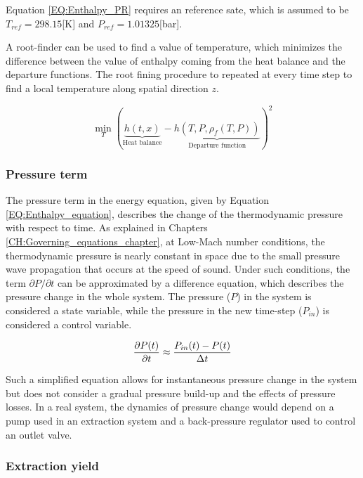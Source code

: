 \documentclass[../Article_Model_Parameters.tex]{subfiles}
\begin{document}
			Equation \ref{EQ:Enthalpy_PR} requires an reference sate, which is assumed to be $T_{ref}=298.15$[K] and $P_{ref}=1.01325$[bar].
			
			A root-finder can be used to find a value of temperature, which minimizes the difference between the value of enthalpy coming from the heat balance and the departure functions. The root fining procedure to repeated at every time step to find a local temperature along spatial direction $z$.
			
			{\footnotesize
				\begin{equation}
					\min_T \left( \underbrace{h\left(t,x\right)}_{\text{Heat balance}} - \underbrace{h\left(T,P,\rho_f\left(T,P\right)\right)}_{\text{Departure function}} \right)^2
					\label{EQ:Enthalpy_root}
				\end{equation}
			}

            \subsubsection{Pressure term} \label{CH: Pressure}
			
			The pressure term in the energy equation, given by Equation \ref{EQ:Enthalpy_equation}, describes the change of the thermodynamic pressure with respect to time. As explained in Chapters \ref{CH:Governing_equations_chapter}, at Low-Mach number conditions, the thermodynamic pressure is nearly constant in space due to the small pressure wave propagation that occurs at the speed of sound. Under such conditions, the term $\partial P/\partial t$ can be approximated by a difference equation, which describes the pressure change in the whole system. The pressure ($P$) in the system is considered a state variable, while the pressure in the new time-step ($P_{in}$) is considered a control variable.
			
			{\footnotesize
				\begin{equation}
					\frac{\partial {\color{black}P}(t)}{\partial t} \approx \frac{{\color{black}P_{in}}(t) - {\color{black}P}(t) }{\Delta t}
			\end{equation}}
			
			Such a simplified equation allows for instantaneous pressure change in the system but does not consider a gradual pressure build-up and the effects of pressure losses. In a real system, the dynamics of pressure change would depend on a pump used in an extraction system and a back-pressure regulator used to control an outlet valve.
			
			\subsubsection{Extraction yield} \label{CH: Yield}
			
\end{document}
